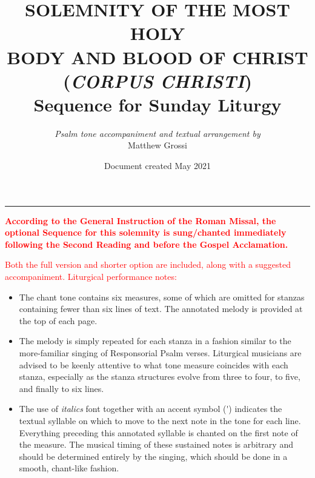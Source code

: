 \documentclass[12pt]{memoir}
\begin{document}
\title{\textbf{SOLEMNITY OF THE MOST HOLY \\ BODY AND BLOOD OF CHRIST \\ (\textit{CORPUS CHRISTI})} \\[1cm]
Sequence for Sunday Liturgy \\[1em]
\textcolor{red}{\CrossMaltese{}}}
\author{\textit{Psalm tone accompaniment and textual arrangement by} \\ Matthew Grossi}
\date{Document created May 2021}

\maketitle

\hrule
\vspace{2em}
\textcolor{red}{%
\textbf{According to the General Instruction of the Roman Missal, the optional Sequence for this solemnity is sung/chanted immediately following the Second Reading and before the Gospel Acclamation.} \\}

\textcolor{red}{%
Both the full version and shorter option are included, along with a suggested  accompaniment. Liturgical performance notes:}

\begin{itemize}
\color{red}
\item[\CrossMaltese{}] The chant tone contains six measures, some of which are omitted for stanzas containing fewer than six lines of text. The annotated melody is provided at the top of each page. %

\item[\CrossMaltese{}] The melody is simply repeated for each stanza in a fashion similar to the more-familiar singing of Responsorial Psalm verses. Liturgical musicians are advised to be keenly attentive to what tone measure coincides with each stanza, especially as the stanza structures evolve from three to four, to five, and finally to six lines.

\item[\CrossMaltese{}] The use of \textit{italics} font together with an accent symbol (\'{ }) indicates the textual syllable on which to move to the next note in the tone for each line. Everything preceding this annotated syllable is chanted on the first note of the measure. The musical timing of these sustained notes is arbitrary and should be determined entirely by the singing, which should be done in a smooth, chant-like fashion.

\end{itemize}
\end{document}
